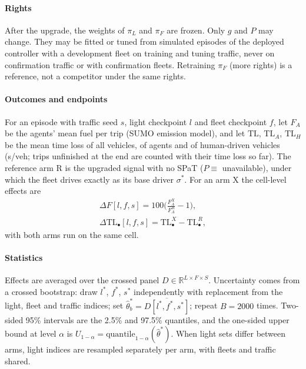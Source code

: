 \paragraph{Rights} After the upgrade, the weights of $\pi_L$ and $\pi_F$ are frozen. Only $g$ and $P$ may change. They may be fitted or
tuned from simulated episodes of the deployed controller with a development fleet on training and tuning traffic, never on confirmation
traffic or with confirmation fleets. Retraining $\pi_F$ (more rights) is a reference, not a competitor under the same rights.
\paragraph{Outcomes and endpoints} For an episode with traffic seed $s$, light checkpoint $l$ and fleet checkpoint $f$, let $F_A$ be the
agents' mean fuel per trip (SUMO emission model), and let $\mathrm{TL}$, $\mathrm{TL}_A$, $\mathrm{TL}_H$ be the mean time loss of all vehicles,
of agents and of human-driven vehicles (s/veh; trips unfinished at the end are counted with their time loss so far). The reference arm R
is the upgraded signal with no SPaT ($P\equiv$ unavailable), under which the fleet drives exactly as its base driver $\sigma^*$. For an arm
X the cell-level effects are
\begin{gather}
\Delta F[l,f,s] = 100\Big(\frac{F_A^{X}}{F_A^{R}}-1\Big),\\
\Delta\mathrm{TL}_\bullet[l,f,s]=\mathrm{TL}_\bullet^{X}-\mathrm{TL}_\bullet^{R},
\end{gather}
with both arms run on the same cell.
\paragraph{Statistics} Effects are averaged over the crossed panel $D\in\mathbb R^{L\times F\times S}$. Uncertainty comes from a crossed
bootstrap: draw $l^*$, $f^*$, $s^*$ independently with replacement from the light, fleet and traffic indices; set
$\hat\theta^*_b=\overline{D[l^*,f^*,s^*]}$; repeat $B=2000$ times. Two-sided 95\% intervals are the 2.5\% and 97.5\% quantiles, and the
one-sided upper bound at level $\alpha$ is $U_{1-\alpha}=\mathrm{quantile}_{1-\alpha}(\hat\theta^*)$. When light sets differ between
arms, light indices are resampled separately per arm, with fleets and traffic shared.
